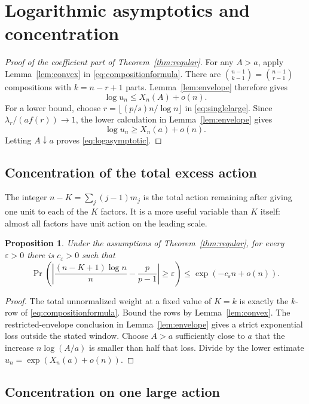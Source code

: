 \documentclass[11pt,a4paper]{article}
\numberwithin{equation}{section}
\newtheorem{proposition}[theorem]{Proposition}
\theoremstyle{definition}
\theoremstyle{remark}
\begin{document}
\section{Logarithmic asymptotics and concentration}
\label{sec:asymptotics}

\begin{proof}[Proof of the coefficient part of Theorem~\ref{thm:regular}]
For any $A>a$, apply Lemma~\ref{lem:convex} in
\eqref{eq:compositionformula}.  There are
$\binom{n-1}{k-1}=\binom{n-1}{r-1}$ compositions with $k=n-r+1$ parts.
Lemma~\ref{lem:envelope} therefore gives
\[
 \log u_n\le X_n(A)+o(n).
\]
For a lower bound, choose $r=\lfloor (p/s)n/\log n\rfloor$ in
\eqref{eq:singlelarge}.  Since $\lambda_r/(a f(r))\to1$, the lower
calculation in Lemma~\ref{lem:envelope} gives
\[
 \log u_n\ge X_n(a)+o(n).
\]
Letting $A\downarrow a$ proves \eqref{eq:logasymptotic}.
\end{proof}

\subsection{Concentration of the total excess action}

The integer $n-K=\sum_j(j-1)m_j$ is the total action remaining after giving
one unit to each of the $K$ factors.  It is a more useful variable than
$K$ itself: almost all factors have unit action on the leading scale.

\begin{proposition}
\label{prop:excess}
Under the assumptions of Theorem~\ref{thm:regular}, for every
$\varepsilon>0$ there is $c_\varepsilon>0$ such that
\[
 \Pr\!\left(\left|\frac{(n-K+1)\log n}{n}-\frac p{p-1}\right|
                \ge\varepsilon\right)
 \le\exp(-c_\varepsilon n+o(n)).
\]
\end{proposition}

\begin{proof}
The total unnormalized weight at a fixed value of $K=k$ is exactly the
$k$-row of \eqref{eq:compositionformula}.  Bound the rows by
Lemma~\ref{lem:convex}.  The restricted-envelope conclusion in
Lemma~\ref{lem:envelope} gives a strict exponential loss outside the stated
window.  Choose $A>a$ sufficiently close to $a$ that the increase
$n\log(A/a)$ is smaller than half that loss.  Divide by the lower estimate
$u_n=\exp(X_n(a)+o(n))$.
\end{proof}

\subsection{Concentration on one large action}
\end{document}
